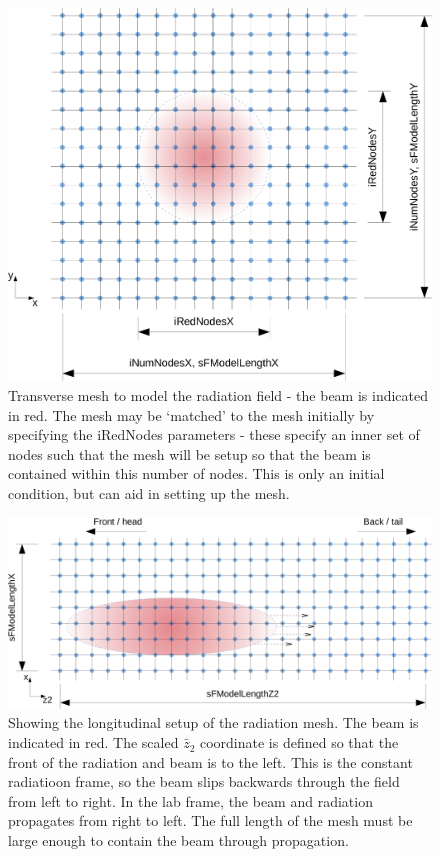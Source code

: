 \documentclass[12pt]{article}%
\begin{document}
\begin{figure}
\centering
\includegraphics[width=150mm]{trans_mesh2.png}
\caption{Transverse mesh to model the radiation field - the beam is indicated in red. The mesh may be `matched' to the mesh initially by specifying the iRedNodes parameters - these specify an inner set of nodes such that the mesh will be setup so that the beam is contained within this number of nodes. This is only an initial condition, but can aid in setting up the mesh.}
\label{trmsh}
\end{figure}



\begin{figure}
\centering
\includegraphics[width=150mm]{long_mesh.png}
\caption{Showing the longitudinal setup of the radiation mesh. The beam is indicated in red. The scaled $\bar{z}_2$ coordinate is defined so that the front of the radiation and beam is to the left. This is the constant radiatioon frame, so the beam slips backwards through the field from left to right. In the lab frame, the beam and radiation propagates from right to left. The full length of the mesh must be large enough to contain the beam through propagation.}
\label{lgmsh}
\end{figure}
\end{document}
